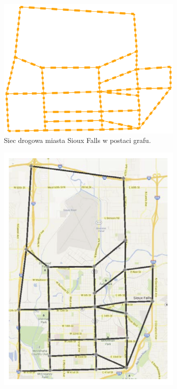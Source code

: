 \documentclass[twoside,12pt]{report}
\begin{document}
\vspace*{30px}
\begin{figure}[h]
\begin{flushleft}
	\begin{subfigure}[]{.45\textwidth}
	\centering
	\includegraphics[width=\linewidth]{img/graf}
	\caption{Siec drogowa miasta Sioux Falls w postaci grafu.}
	\end{subfigure}%
\end{flushleft}
\begin{flushright}
	\begin{subfigure}[]{.45\textwidth}
	\centering
	\includegraphics[width=\linewidth]{img/dopasowanie}

\end{subfigure}
\end{flushright}
\end{figure}
\end{document}
